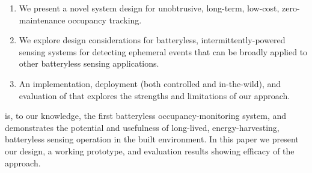 \begin{enumerate}[label=\arabic*., align=left, leftmargin=*]
	\item We present a novel system design for unobtrusive, long-term, low-cost, zero-maintenance occupancy tracking.
	\item We explore design considerations for batteryless, intermittently-powered sensing systems for detecting ephemeral events that can be broadly applied to other batteryless sensing applications.
	\item An implementation, deployment (both controlled and in-the-wild), and evaluation of \sysname that explores the strengths and limitations of our approach. 
\end{enumerate}

\noind
\sysname is, to our knowledge, the first batteryless occupancy-monitoring system, and demonstrates the potential and usefulness of long-lived, energy-harvesting, batteryless sensing operation in the built environment.
In this paper we present our design, a working prototype, and evaluation results showing efficacy of the approach.


